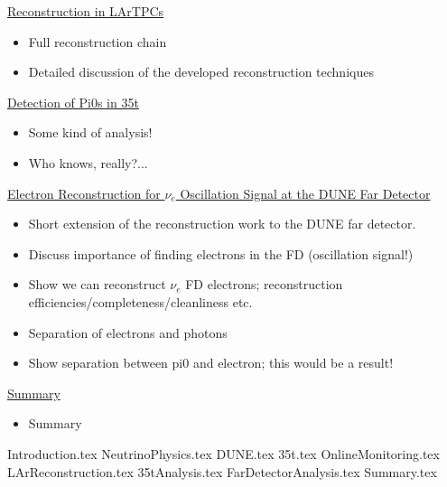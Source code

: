\documentclass[a4paper,12pt]{report}
\begin{document}
\underline{Reconstruction in LArTPCs}
\begin{itemize}
  \item{Full reconstruction chain}
  \item{Detailed discussion of the developed reconstruction techniques}
\end{itemize}

\underline{Detection of Pi0s in 35t}
\begin{itemize}
  \item{Some kind of analysis!}
  \item{Who knows, really?...}
\end{itemize}

\underline{Electron Reconstruction for $\nu_e$ Oscillation Signal at the DUNE Far Detector}
\begin{itemize}
  \item{Short extension of the reconstruction work to the DUNE far detector.}
  \item{Discuss importance of finding electrons in the FD (oscillation signal!)}
  \item{Show we can reconstruct $\nu_e$ FD electrons; reconstruction efficiencies/completeness/cleanliness etc.}
  \item{Separation of electrons and photons}
  \item{Show separation between pi0 and electron; this would be a result!}
\end{itemize}

\underline{Summary}
\begin{itemize}
  \item{Summary}
\end{itemize}

\pagebreak


\renewcommand{\thepage}{\arabic{page}}
\setcounter{page}{1}

{Introduction.tex}
{NeutrinoPhysics.tex}
{DUNE.tex}
{35t.tex}
{OnlineMonitoring.tex}
{LArReconstruction.tex}
{35tAnalysis.tex}
{FarDetectorAnalysis.tex}
{Summary.tex}

\printbibliography[title={Bibliography}]
\end{document}

